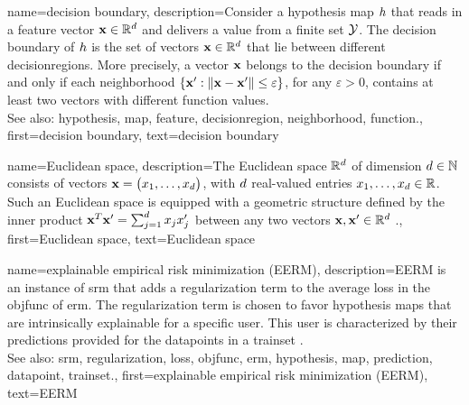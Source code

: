 {name={decision boundary}, 
	description={Consider a 
		\gls{hypothesis} \gls{map} $h$ that reads in a \gls{feature} vector 
		${\bf x} \in \mathbb{R}^{d}$ and delivers a value from a finite set $\mathcal{Y}$. 
		The decision boundary of $h$ is the set of vectors ${\bf x} \in \mathbb{R}^{d}$ 
		that lie between different \glspl{decisionregion}. More precisely, a 
		vector ${\bf x}$ belongs to the decision boundary if and only 
		if each \gls{neighborhood} $\{ {\bf x}': \| {\bf x} - {\bf x}' \| \leq \varepsilon \}$, 
		for any $\varepsilon >0$, contains at least two vectors with different \gls{function} values.
				\\
		See also: \gls{hypothesis}, \gls{map}, \gls{feature}, \gls{decisionregion}, \gls{neighborhood}, \gls{function}.},
	first={decision boundary},
	text={decision boundary} 
}


{name={Euclidean space}, 
	description={The 
		Euclidean space $\mathbb{R}^{d}$ of dimension $d \in \mathbb{N}$ consists 
		of vectors ${\bf x}= \big(x_{1}, \ldots, x_{d}\big)$, with $d$ 
		real-valued entries $x_{1}, \ldots, x_{d} \in \mathbb{R}$. Such an Euclidean 
		space is equipped with a geometric structure defined by the inner product 
		${\bf x}^{T} {\bf x}' = \sum_{j=1}^{d} x_{j} x'_{j}$ 
		between any two vectors ${\bf x},{\bf x}' \in \mathbb{R}^{d}$ \cite{RudinBookPrinciplesMatheAnalysis}.},
	first={Euclidean space},
	text={Euclidean space} 
}

{name={explainable empirical risk minimization (EERM)}, 
	description={EERM is an 
		instance of \gls{srm} that adds a \gls{regularization} term to the 
		average \gls{loss} in the \gls{objfunc} of \gls{erm}. 
		The \gls{regularization} term is chosen to favor \gls{hypothesis} \glspl{map} that are intrinsically 
		explainable for a specific user. This user is characterized by their \glspl{prediction} provided 
		for the \glspl{datapoint} in a \gls{trainset} \cite{Zhang:2024aa}.
				\\
		See also: \gls{srm}, \gls{regularization}, \gls{loss}, \gls{objfunc}, \gls{erm}, \gls{hypothesis}, \gls{map}, \gls{prediction}, \gls{datapoint}, \gls{trainset}.},
	first={explainable empirical risk minimization (EERM)},
	text={EERM} 
}
	
